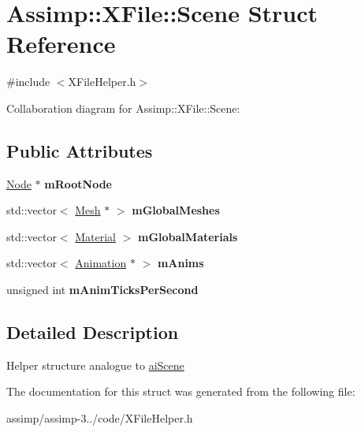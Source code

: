 \hypertarget{struct_assimp_1_1_x_file_1_1_scene}{\section{Assimp\+:\+:X\+File\+:\+:Scene Struct Reference}
\label{struct_assimp_1_1_x_file_1_1_scene}
}


{\ttfamily \#include $<$X\+File\+Helper.\+h$>$}



Collaboration diagram for Assimp\+:\+:X\+File\+:\+:Scene\+:
\subsection*{Public Attributes}
\begin{DoxyCompactItemize}
\item 
\hypertarget{struct_assimp_1_1_x_file_1_1_scene_a0a49fc0ed0ab13101685a789347a3622}{\hyperlink{struct_assimp_1_1_x_file_1_1_node}{Node} $\ast$ {\bfseries m\+Root\+Node}}\label{struct_assimp_1_1_x_file_1_1_scene_a0a49fc0ed0ab13101685a789347a3622}

\item 
\hypertarget{struct_assimp_1_1_x_file_1_1_scene_a18e22e4b5bb976042c9b26a892ffa9a7}{std\+::vector$<$ \hyperlink{struct_assimp_1_1_x_file_1_1_mesh}{Mesh} $\ast$ $>$ {\bfseries m\+Global\+Meshes}}\label{struct_assimp_1_1_x_file_1_1_scene_a18e22e4b5bb976042c9b26a892ffa9a7}

\item 
\hypertarget{struct_assimp_1_1_x_file_1_1_scene_a1f31ff8452835ccb8faacd4cc34c25d2}{std\+::vector$<$ \hyperlink{struct_assimp_1_1_x_file_1_1_material}{Material} $>$ {\bfseries m\+Global\+Materials}}\label{struct_assimp_1_1_x_file_1_1_scene_a1f31ff8452835ccb8faacd4cc34c25d2}

\item 
\hypertarget{struct_assimp_1_1_x_file_1_1_scene_aeeccfe47677ae9582f754fc83df93626}{std\+::vector$<$ \hyperlink{struct_assimp_1_1_x_file_1_1_animation}{Animation} $\ast$ $>$ {\bfseries m\+Anims}}\label{struct_assimp_1_1_x_file_1_1_scene_aeeccfe47677ae9582f754fc83df93626}

\item 
\hypertarget{struct_assimp_1_1_x_file_1_1_scene_ab8d47b4ebc6a72f77e6ea123861c59d3}{unsigned int {\bfseries m\+Anim\+Ticks\+Per\+Second}}\label{struct_assimp_1_1_x_file_1_1_scene_ab8d47b4ebc6a72f77e6ea123861c59d3}

\end{DoxyCompactItemize}


\subsection{Detailed Description}
Helper structure analogue to \hyperlink{structai_scene}{ai\+Scene} 

The documentation for this struct was generated from the following file\+:\begin{DoxyCompactItemize}
\item 
assimp/assimp-\/3../code/X\+File\+Helper.\+h\end{DoxyCompactItemize}
